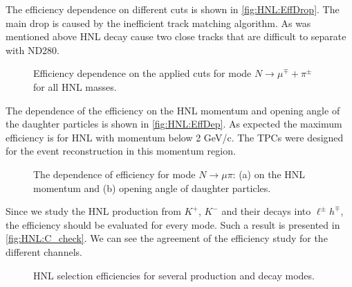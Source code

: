 \documentclass[../main.tex]{subfiles}
\begin{document}
The efficiency dependence on different cuts is shown in \autoref{fig:HNL:EffDrop}. The main drop is caused by the inefficient track matching algorithm. As was mentioned above HNL decay cause two close tracks that are difficult to separate with ND280.

\begin{figure}[!ht]
  \caption{Efficiency dependence on the applied cuts for mode $N\to\mu^\mp+\pi^\pm$ for all HNL masses.}
  \label{fig:HNL:EffDrop}
\end{figure}

The dependence of the efficiency on the HNL momentum and opening angle of the daughter particles is shown in \autoref{fig:HNL:EffDep}. As expected the maximum efficiency is for HNL with momentum below 2 GeV/c. The TPCs were designed for the event reconstruction in this momentum region.
\begin{figure}[!ht]
  \begin{minipage}{0.49\linewidth}
  \end{minipage}
  \hfill
  \begin{minipage}{0.49\linewidth}
  \end{minipage}
  \caption{The dependence of efficiency for mode $N\to\mu\pi$: (a) on the HNL momentum and (b) opening angle of daughter particles.}
  \label{fig:HNL:EffDep}
\end{figure}

Since we study the HNL production from $K^+$,  $K^-$ and their decays into $\ell^{\pm}h^{\mp}$, the efficiency should be evaluated for every mode. Such a result is presented in \autoref{fig:HNL:C_check}. We can see the agreement of the efficiency study for the different channels.

\begin{figure}[!ht]
  \begin{minipage}{0.49\linewidth}
  \end{minipage}
  \hfill
  \begin{minipage}{0.49\linewidth}
  \end{minipage}
  \caption{HNL selection efficiencies for several production and decay modes.}
  \label{fig:HNL:C_check}
\end{figure}
\end{document}
